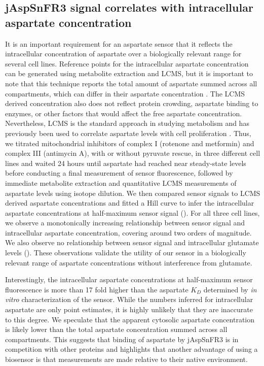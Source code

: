 \documentclass[9pt,lineno]{elife}
\begin{document}
\subsection{jAspSnFR3 signal correlates with intracellular aspartate concentration}
It is an important requirement for an aspartate sensor that it reflects the intracellular concentration of aspartate over a biologically relevant range for several cell lines.
Reference points for the intracellular aspartate concentration can be generated using metabolite extraction and LCMS, but it is important to note that this technique reports the total amount of aspartate summed across all compartments, which can differ in their aspartate concentration \citep{Chen2016-mf}.
The LCMS derived concentration also does not reflect protein crowding, aspartate binding to enzymes, or other factors that would affect the free aspartate concentration.
Nevertheless, LCMS is the standard approach in studying metabolism and has previously been used to correlate aspartate levels with cell proliferation \citep{Gui2016-ca, Hart2023-gp}.
Thus, we titrated mitochondrial inhibitors of complex I (rotenone and metformin) and complex III (antimycin A), with or without pyruvate rescue, in three different cell lines and waited 24 hours until aspartate had reached near steady-state levels before conducting a final measurement of sensor fluorescence, followed by immediate metabolite extraction and quantitative LCMS measurements of aspartate levels using isotope dilution.
We then compared sensor signals to LCMS derived aspartate concentrations and fitted a Hill curve to infer the intracellular aspartate concentrations at half-maximum sensor signal ().
For all three cell lines, we observe a monotonically increasing relationship between sensor signal and intracellular aspartate concentration, covering around two orders of magnitude.
We also observe no relationship between sensor signal and intracellular glutamate levels ().
These observations validate the utility of our sensor in a biologically relevant range of aspartate concentrations without interference from glutamate.

Interestingly, the intracellular aspartate concentrations at half-maximum sensor fluorescence is more than 17 fold higher than the aspartate $K_D$ determined by \textit{in vitro} characterization of the sensor.
While the numbers inferred for intracellular aspartate are only point estimates, it is highly unlikely that they are inaccurate to this degree. 
We speculate that the apparent cytosolic aspartate concentration is likely lower than the total aspartate concentration summed across all compartments.
This suggests that binding of aspartate by jAspSnFR3 is in competition with other proteins and highlights that another advantage of using a biosensor is that measurements are made relative to their native environment.
\end{document}
